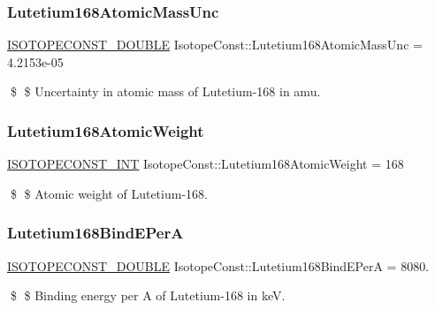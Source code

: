 \subsubsection{\texorpdfstring{Lutetium168\+Atomic\+Mass\+Unc}{Lutetium168AtomicMassUnc}}
{\footnotesize\ttfamily \mbox{\hyperlink{group___isotope_const-_macros_ga8f45a7272ce02c0b4c65c44636ed719a}{I\+S\+O\+T\+O\+P\+E\+C\+O\+N\+S\+T\+\_\+\+D\+O\+U\+B\+LE}} Isotope\+Const\+::\+Lutetium168\+Atomic\+Mass\+Unc = 4.\+2153e-\/05}

\$ \$ Uncertainty in atomic mass of Lutetium-\/168 in amu. \mbox{\label{group___isotope_const-_lutetium-_lu168_ga6c90b561bb846eef9aa1e5d02c3d1479}} 
\subsubsection{\texorpdfstring{Lutetium168\+Atomic\+Weight}{Lutetium168AtomicWeight}}
{\footnotesize\ttfamily \mbox{\hyperlink{group___isotope_const-_macros_ga5f18360b3e99483a35c32d789e62621c}{I\+S\+O\+T\+O\+P\+E\+C\+O\+N\+S\+T\+\_\+\+I\+NT}} Isotope\+Const\+::\+Lutetium168\+Atomic\+Weight = 168}

\$ \$ Atomic weight of Lutetium-\/168. \mbox{\label{group___isotope_const-_lutetium-_lu168_ga10787c48aff7e3a43ea922e8df4a0adc}} 
\subsubsection{\texorpdfstring{Lutetium168\+Bind\+E\+PerA}{Lutetium168BindEPerA}}
{\footnotesize\ttfamily \mbox{\hyperlink{group___isotope_const-_macros_ga8f45a7272ce02c0b4c65c44636ed719a}{I\+S\+O\+T\+O\+P\+E\+C\+O\+N\+S\+T\+\_\+\+D\+O\+U\+B\+LE}} Isotope\+Const\+::\+Lutetium168\+Bind\+E\+PerA = 8080.}

\$ \$ Binding energy per A of Lutetium-\/168 in keV. \mbox{\label{group___isotope_const-_lutetium-_lu168_gabfd085a999f9b79c63c2305fb6c4d1a7}} 
